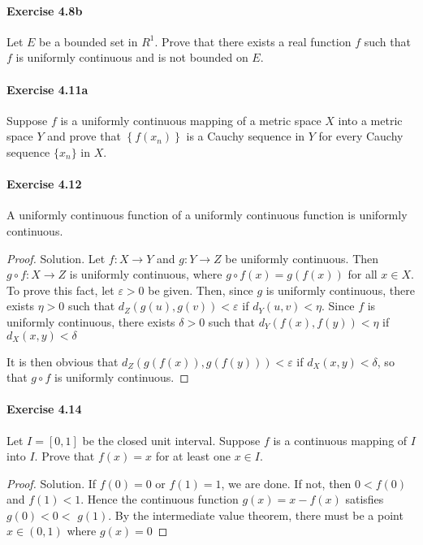 \documentclass{article}
\theoremstyle{definition}
\begin{document}
\paragraph{Exercise 4.8b} Let $E$ be a bounded set in $R^{1}$. Prove that there exists a real function $f$ such that $f$ is uniformly continuous and is not bounded on $E$.

\paragraph{Exercise 4.11a} Suppose $f$ is a uniformly continuous mapping of a metric space $X$ into a metric space $Y$ and prove that $\left\{f\left(x_{n}\right)\right\}$ is a Cauchy sequence in $Y$ for every Cauchy sequence $\{x_n\}$ in $X$.

\paragraph{Exercise 4.12} A uniformly continuous function of a uniformly continuous function is uniformly continuous.
\begin{proof}
    Solution. Let $f: X \rightarrow Y$ and $g: Y \rightarrow Z$ be uniformly continuous. Then $g \circ f: X \rightarrow Z$ is uniformly continuous, where $g \circ f(x)=g(f(x))$ for all $x \in X$.
To prove this fact, let $\varepsilon>0$ be given. Then, since $g$ is uniformly continuous, there exists $\eta>0$ such that $d_Z(g(u), g(v))<\varepsilon$ if $d_Y(u, v)<\eta$. Since $f$ is uniformly continuous, there exists $\delta>0$ such that $d_Y(f(x), f(y))<\eta$ if $d_X(x, y)<\delta$

It is then obvious that $d_Z(g(f(x)), g(f(y)))<\varepsilon$ if $d_X(x, y)<\delta$, so that $g \circ f$ is uniformly continuous.
\end{proof}


\paragraph{Exercise 4.14} Let $I=[0,1]$ be the closed unit interval. Suppose $f$ is a continuous mapping of $I$ into $I$. Prove that $f(x)=x$ for at least one $x \in I$.
\begin{proof}
    Solution. If $f(0)=0$ or $f(1)=1$, we are done. If not, then $0<f(0)$ and $f(1)<1$. Hence the continuous function $g(x)=x-f(x)$ satisfies $g(0)<0<$ $g(1)$. By the intermediate value theorem, there must be a point $x \in(0,1)$ where $g(x)=0$
\end{proof}
\end{document}
